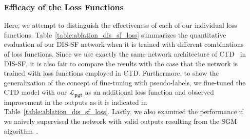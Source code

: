 \subsubsection{Efficacy of the Loss Functions} \label{sec:c2_ablation_loss}
Here, we attempt to distinguish the effectiveness of each of our individual loss functions. Table~\ref{table:ablation_dis_sf_loss} summarizes the quantitative evaluation of our DIS-SF network when it is trained with different combinations of loss functions. Since we use exactly the same network architecture of CTD~\cite{riegler2019connecting} in DIS-SF, it is also fair to compare the results with the case that the network is trained with loss functions employed in CTD. Furthermore, to show the generalization of the concept of fine-tuning with pseudo-labels, we fine-tuned the CTD model with our $\boldsymbol{\mathcal{L}_{pgt}}$ as an additional loss function and observed improvement in the outputs as it is indicated in Table~\ref{table:ablation_dis_sf_loss}. Lastly, we also examined the performance if we naively supervised the network with valid outputs resulting from the SGM algorithm~\cite{hirschmuller2007stereo}.

